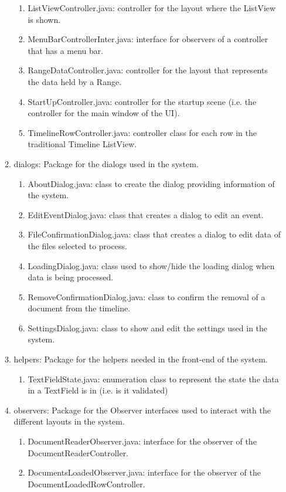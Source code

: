 \begin{enumerate}
\begin{enumerate}
\begin{enumerate}
			\item ListViewController.java: controller for the layout where the ListView is shown.
			\item MenuBarControllerInter.java: interface for observers of a controller that has a menu bar.
			\item RangeDataController.java: controller for the layout that represents the data held by a Range.
			\item StartUpController.java: controller for the startup scene (i.e. the controller for the main window of the UI).
			\item TimelineRowController.java: controller class for each row in the traditional Timeline ListView.
		\end{enumerate}
		\item dialogs: Package for the dialogs used in the system.
		\begin{enumerate}
			\item AboutDialog.java: class to create the dialog providing information of the system.
			\item EditEventDialog.java: class that creates a dialog to edit an event.
			\item FileConfirmationDialog.java: class that creates a dialog to edit data of the files selected to process.
			\item LoadingDialog.java: class used to show/hide the loading dialog when data is being processed.
			\item RemoveConfirmationDialog.java: class to confirm the removal of a document from the timeline.
			\item SettingsDialog.java: class to show and edit the settings used in the system.
		\end{enumerate}
		\item helpers: Package for the helpers needed in the front-end of the system.
		\begin{enumerate}
			\item TextFieldState.java: enumeration class to represent the state the data in a TextField is in (i.e. is it validated)
		\end{enumerate}
		\item observers: Package for the Observer interfaces used to interact with the different layouts in the system.
		\begin{enumerate}
			\item DocumentReaderObserver.java: interface for the observer of the DocumentReaderController.
			\item DocumentsLoadedObserver.java: interface for the observer of the DocumentLoadedRowController.

\end{enumerate}
\end{enumerate}
\end{enumerate}
